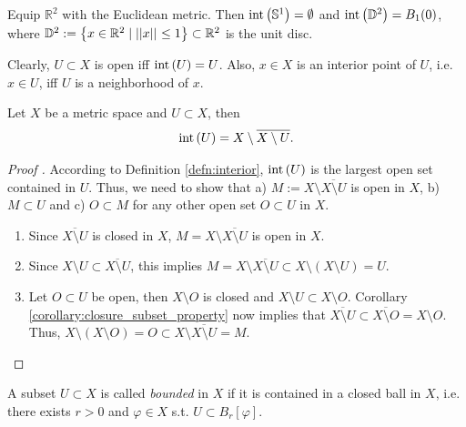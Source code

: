 \begin{exmp}
	Equip $\mathbb R^2$ with the Euclidean metric. Then $\text{int}\left( \mathbb S^1 \right) = \emptyset$ and $\text{int}\left( \mathbb D^2 \right) = B_{1}(0)$, where $\mathbb D^2 := \left\{ x\in\mathbb R^2\mid \left\vert\left\vert x \right\vert\right\vert_{} \leq 1 \right\} \subset \mathbb R^2$ is the unit disc.
\end{exmp}

\begin{remark}
	Clearly, $U\subset X$ is open iff $\text{int}\left( U \right) = U$. Also, $x\in X$ is an interior point of $U$, i.e. $x\in U$, iff $U$ is a neighborhood of $x$.
\end{remark}

\begin{theorem}\label{thrm:interior_complement}
	Let $X$ be a metric space and $U\subset X$, then 
	\begin{align}\label{eq:interior_complement}
		\text{int}\left( U \right) = X\setminus \overline{X\setminus U}.
	\end{align}
\end{theorem}

\begin{proof}[Proof \cite{872424}]
	According to Definition \ref{defn:interior}, $\text{int}\left( U \right)$ is the largest open set contained in $U$. 
	Thus, we need to show that a) $M := X\setminus \overline{X\setminus U}$ is open in $X$, b) $M\subset U$ and c) $O\subset M$ for any other open set $O \subset U$ in $X$.
	\begin{enumerate}[label=\alph*)]
		\item Since $\overline{X\setminus U}$ is closed in $X$, $M = X\setminus \overline{X\setminus U}$ is open in $X$.
		\item Since $X\setminus U\subset \overline{X\setminus U}$, this implies $M = X\setminus \overline{X\setminus U} \subset X\setminus \left( X\setminus U \right) = U$.
		\item Let $O\subset U$ be open, then $X\setminus O$ is closed and $X\setminus U\subset X\setminus O$. Corollary \ref{corollary:closure_subset_property} now implies that $\overline{X\setminus U}\subset \overline{X\setminus O} = X\setminus O$. Thus, $X\setminus(X\setminus O) = O\subset  X\setminus\overline{X\setminus U} = M$.
	\end{enumerate}
\end{proof}

\begin{defn}\label{defn:bounded_set}
	A subset $U\subset X$ is called \textit{bounded} in $X$ if it is contained in a closed ball in $X$, i.e. there exists $r > 0$ and $\varphi \in X$ s.t. $U\subset B_{r}[\varphi]$.
\end{defn}

